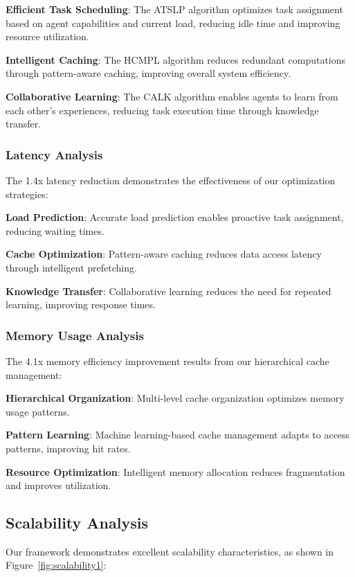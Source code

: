 \documentclass[conference]{IEEEtran}
\begin{document}
\textbf{Efficient Task Scheduling}: The ATSLP algorithm optimizes task assignment based on agent capabilities and current load, reducing idle time and improving resource utilization.

\textbf{Intelligent Caching}: The HCMPL algorithm reduces redundant computations through pattern-aware caching, improving overall system efficiency.

\textbf{Collaborative Learning}: The CALK algorithm enables agents to learn from each other's experiences, reducing task execution time through knowledge transfer.

\subsubsection{Latency Analysis}

The 1.4x latency reduction demonstrates the effectiveness of our optimization strategies:

\textbf{Load Prediction}: Accurate load prediction enables proactive task assignment, reducing waiting times.

\textbf{Cache Optimization}: Pattern-aware caching reduces data access latency through intelligent prefetching.

\textbf{Knowledge Transfer}: Collaborative learning reduces the need for repeated learning, improving response times.

\subsubsection{Memory Usage Analysis}

The 4.1x memory efficiency improvement results from our hierarchical cache management:

\textbf{Hierarchical Organization}: Multi-level cache organization optimizes memory usage patterns.

\textbf{Pattern Learning}: Machine learning-based cache management adapts to access patterns, improving hit rates.

\textbf{Resource Optimization}: Intelligent memory allocation reduces fragmentation and improves utilization.

\subsection{Scalability Analysis}

Our framework demonstrates excellent scalability characteristics, as shown in Figure~\ref{fig:scalability1}:
\end{document}
